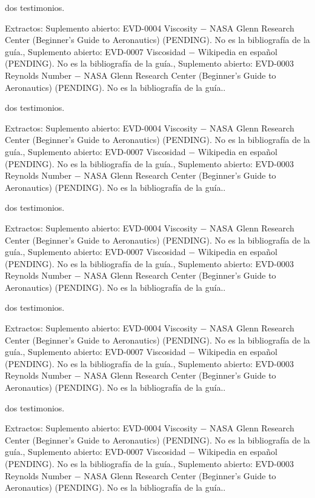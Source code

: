 \documentclass{book}
\begin{document}
\noindent dos testimonios.

\noindent Extractos: Suplemento abierto: EVD-0004 Viscosity \(-\) NASA Glenn Research Center (Beginner's Guide to Aeronautics) (PENDING). No es la bibliografía de la guía., Suplemento abierto: EVD-0007 Viscosidad \(-\) Wikipedia en español (PENDING). No es la bibliografía de la guía., Suplemento abierto: EVD-0003 Reynolds Number \(-\) NASA Glenn Research Center (Beginner's Guide to Aeronautics) (PENDING). No es la bibliografía de la guía..

\noindent dos testimonios.

\noindent Extractos: Suplemento abierto: EVD-0004 Viscosity \(-\) NASA Glenn Research Center (Beginner's Guide to Aeronautics) (PENDING). No es la bibliografía de la guía., Suplemento abierto: EVD-0007 Viscosidad \(-\) Wikipedia en español (PENDING). No es la bibliografía de la guía., Suplemento abierto: EVD-0003 Reynolds Number \(-\) NASA Glenn Research Center (Beginner's Guide to Aeronautics) (PENDING). No es la bibliografía de la guía..

\noindent dos testimonios.

\noindent Extractos: Suplemento abierto: EVD-0004 Viscosity \(-\) NASA Glenn Research Center (Beginner's Guide to Aeronautics) (PENDING). No es la bibliografía de la guía., Suplemento abierto: EVD-0007 Viscosidad \(-\) Wikipedia en español (PENDING). No es la bibliografía de la guía., Suplemento abierto: EVD-0003 Reynolds Number \(-\) NASA Glenn Research Center (Beginner's Guide to Aeronautics) (PENDING). No es la bibliografía de la guía..

\noindent dos testimonios.

\noindent Extractos: Suplemento abierto: EVD-0004 Viscosity \(-\) NASA Glenn Research Center (Beginner's Guide to Aeronautics) (PENDING). No es la bibliografía de la guía., Suplemento abierto: EVD-0007 Viscosidad \(-\) Wikipedia en español (PENDING). No es la bibliografía de la guía., Suplemento abierto: EVD-0003 Reynolds Number \(-\) NASA Glenn Research Center (Beginner's Guide to Aeronautics) (PENDING). No es la bibliografía de la guía..

\noindent dos testimonios.

\noindent Extractos: Suplemento abierto: EVD-0004 Viscosity \(-\) NASA Glenn Research Center (Beginner's Guide to Aeronautics) (PENDING). No es la bibliografía de la guía., Suplemento abierto: EVD-0007 Viscosidad \(-\) Wikipedia en español (PENDING). No es la bibliografía de la guía., Suplemento abierto: EVD-0003 Reynolds Number \(-\) NASA Glenn Research Center (Beginner's Guide to Aeronautics) (PENDING). No es la bibliografía de la guía..
\end{document}
